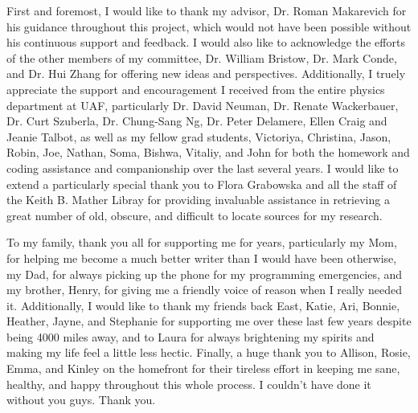 
First and foremost, I would like to thank my advisor, Dr. Roman Makarevich for his guidance throughout this project, which would not have been possible without his continuous support and feedback.  I would also like to acknowledge the efforts of the other members of my committee, Dr. William Bristow, Dr. Mark Conde, and Dr. Hui Zhang for offering new ideas and perspectives.  Additionally, I truely appreciate the support and encouragement I received from the entire physics department at UAF, particularly Dr. David Neuman, Dr. Renate Wackerbauer, Dr. Curt Szuberla, Dr. Chung-Sang Ng, Dr. Peter Delamere, Ellen Craig and Jeanie Talbot, as well as my fellow grad students, Victoriya, Christina, Jason, Robin, Joe, Nathan, Soma, Bishwa, Vitaliy, and John for both the homework and coding assistance and companionship over the last several years.  I would like to extend a particularly special thank you to Flora Grabowska and all the staff of the Keith B. Mather Libray for providing invaluable assistance in retrieving a great number of old, obscure, and difficult to locate sources for my research.  

To my family, thank you all for supporting me for years, particularly my Mom, for helping me become a much better writer than I would have been otherwise, my Dad, for always picking up the phone for my programming emergencies, and my brother, Henry, for giving me a friendly voice of reason when I really needed it.  Additionally, I would like to thank my friends back East, Katie, Ari, Bonnie, Heather, Jayne, and Stephanie for supporting me over these last few years despite being 4000 miles away, and to Laura for always brightening my spirits and making my life feel a little less hectic.  Finally, a huge thank you to Allison, Rosie, Emma, and Kinley on the homefront for their tireless effort in keeping me sane, healthy, and happy throughout this whole process.  I couldn't have done it without you guys.  Thank you.